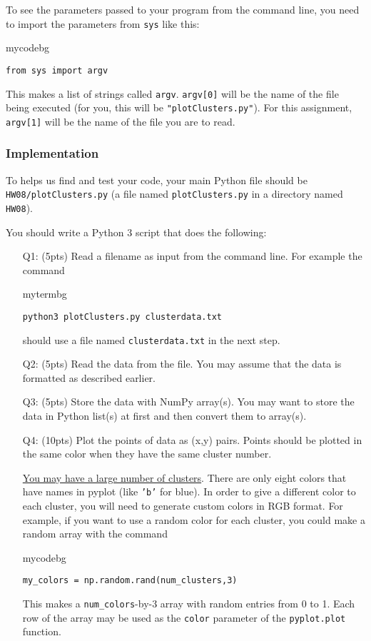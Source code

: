 To see the parameters passed to your program from the command line,
you need to import the parameters from \texttt{sys} like this:
\begin{tsession}{mycodebg}
\begin{verbatim}
from sys import argv\end{verbatim}
\end{tsession}
This makes a list of strings called \texttt{argv}.
\texttt{argv[0]} will be the name of the file being executed (for you, this will be \texttt{"plotClusters.py"}).
For this assignment, \texttt{argv[1]} will be the name of the file you are to read.

\subsubsection*{Implementation}

\begin{tcolorbox}[width=\textwidth,colback=green]
To helps us find and test your code, your main Python file should be \texttt{HW08/plotClusters.py} (a file named \texttt{plotClusters.py} in a directory named \texttt{HW08}).
\end{tcolorbox}
You should write a Python 3 script that does the following:
\begin{enumerate}
    \item[Q1:] (5pts) Read a filename as input from the command line.
    For example the command
    \begin{tsession}{mytermbg}
    \begin{verbatim}
python3 plotClusters.py clusterdata.txt\end{verbatim}
    \end{tsession}
    \noindent should use a file named \texttt{clusterdata.txt} in the next step.
    \item[Q2:] (5pts) Read the data from the file.
    You may assume that the data is formatted as described earlier.
    \item[Q3:] (5pts) Store the data with NumPy array(s).
    You may want to store the data in Python list(s) at first and then convert them to array(s).
    \item[Q4:] (10pts) Plot the points of data as (x,y) pairs.
    Points should be plotted in the same color when they have the same cluster number.
    
    \underline{You may have a large number of clusters}.
    There are only eight colors that have names in pyplot (like \texttt{'b'} for blue).
    In order to give a different color to each cluster,
    you will need to generate custom colors in RGB format.
    For example, if you want to use a random color for each cluster,
    you could make a random array with the command
    \begin{tsession}{mycodebg}
    \begin{verbatim}
my_colors = np.random.rand(num_clusters,3)\end{verbatim}
    \end{tsession}
    This makes a \texttt{num\_colors}-by-3 array with random entries from 0 to 1.
   Each row of the array may be used as the \texttt{color} parameter of the \texttt{pyplot.plot} function.
\end{enumerate}

